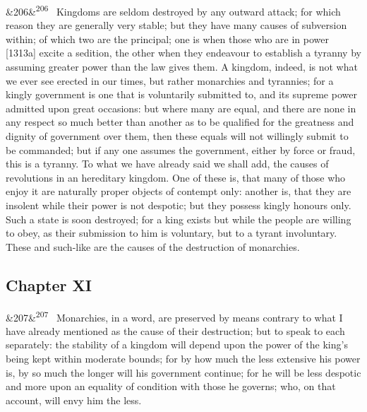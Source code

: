 \documentclass[12pt]{article}
\newcommand{\para}[1][]{\par\noindent\ifx&#1&\else\textsuperscript{\footnotesize #1}~\fi}
\begin{document}
\para[206] Kingdoms are seldom destroyed by any outward attack; for which reason they are generally very stable; but they have many causes of subversion within; of which two are the principal; one is when those who are in power [1313a] excite a sedition, the other when they endeavour to establish a tyranny by assuming greater power than the law gives them. A kingdom, indeed, is not what we ever see erected in our times, but rather monarchies and tyrannies; for a kingly government is one that is voluntarily submitted to, and its supreme power admitted upon great occasions: but where many are equal, and there are none in any respect so much better than another as to be qualified for the greatness and dignity of government over them, then these equals will not willingly submit to be commanded; but if any one assumes the government, either by force or fraud, this is a tyranny. To what we have already said we shall add, the causes of revolutions in an hereditary kingdom. One of these is, that many of those who enjoy it are naturally proper objects of contempt only: another is, that they are insolent while their power is not despotic; but they possess kingly honours only. Such a state is soon destroyed; for a king exists but while the people are willing to obey, as their submission to him is voluntary, but to a tyrant involuntary. These and such-like are the causes of the destruction of monarchies.

\subsection*{Chapter XI}

\para[207] Monarchies, in a word, are preserved by means contrary to what I have already mentioned as the cause of their destruction; but to speak to each separately: the stability of a kingdom will depend upon the power of the king's being kept within moderate bounds; for by how much the less extensive his power is, by so much the longer will his government continue; for he will be less despotic and more upon an equality of condition with those he governs; who, on that account, will envy him the less.
\end{document}
